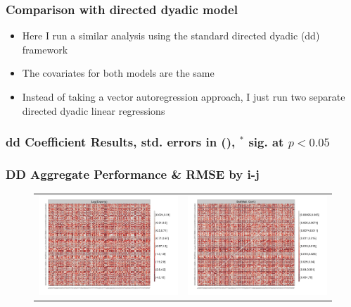 \documentclass[10pt, compress]{beamer}
\begin{document}
\frame
{
  \frametitle{Comparison with directed dyadic model}
  \begin{itemize}
  \item Here I run a similar analysis using the standard directed dyadic (dd) framework
  \item The covariates for both models are the same 
  \item Instead of taking a vector autoregression approach, I just run two separate directed dyadic linear regressions
  \end{itemize}
} 

\frame
{
  \frametitle{dd Coefficient Results, std. errors in (), $^*$ sig. at $p< 0.05 $ }
  \vspace{-.3in}
  \tiny{}
}

\frame
{
\frametitle{DD Aggregate Performance \& RMSE by i-j}
  
  \begin{figure}[ht]
  \centering
    \begin{tabular}{cc}
      \hspace*{-.63in}
      \includegraphics[width=.6\textwidth]{dyadexpiperf.pdf} & 
      \includegraphics[width=.6\textwidth]{dyadmconfiperf.pdf}
    \end{tabular}
  \end{figure}
}

\end{document}
